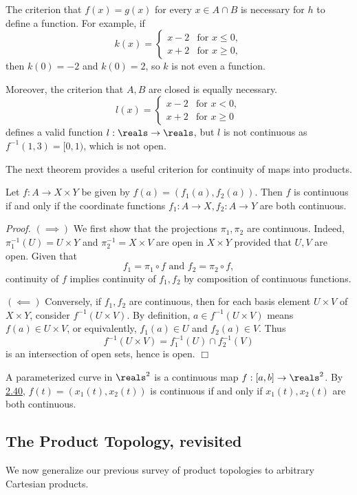 The criterion that $f(x) = g(x)$ for every $x \in A \cap B$ is necessary for $h$ to define a function. For example, if
$$k(x) = \begin{cases}
    x-2 &\text{for } x \leq 0, \\
    x+2 &\text{for } x \geq 0,
\end{cases}$$
then $k(0) = -2$ and $k(0) = 2$, so $k$ is not even a function.

Moreover, the criterion that $A, B$ are closed is equally necessary. 
$$l(x) = \begin{cases}
    x-2 &\text{for } x < 0, \\
    x+2 &\text{for } x \geq 0
\end{cases}$$
defines a valid function $l: \reals \rightarrow \reals$, but $l$ is not continuous as $f^{-1}(1, 3) = [0, 1)$, which is not open.

The next theorem provides a useful criterion for continuity of maps into products.
\begin{theorem}\label{2.40}
    Let $f: A \rightarrow X \times Y$ be given by $f(a) = (f_1(a), f_2(a))$. Then $f$ is continuous if and only if the coordinate functions $f_1: A \rightarrow X, f_2: A \rightarrow Y$ are both continuous.
\end{theorem}
{\it Proof.} $(\implies)$ We first show that the projections $\pi_1, \pi_2$ are continuous. Indeed, $\pi_1^{-1}(U) = U \times Y$ and $\pi_2^{-1} = X \times V$ are open in $X \times Y$ provided that $U, V$ are open. Given that
$$f_1 = \pi_1 \circ f \text{ and } f_2 = \pi_2 \circ f,$$
continuity of $f$ implies continuity of $f_1, f_2$ by composition of continuous functions. 

$(\impliedby)$ Conversely, if $f_1, f_2$ are continuous, then for each basis element $U \times V$ of $X \times Y$, consider $f^{-1}(U \times V)$. By definition, $a \in f^{-1}(U \times V)$ means $f(a) \in U \times V$, or equivalently, $f_1(a) \in U$ and $f_2(a) \in V$. Thus
$$f^{-1}(U \times V) = f_1^{-1}(U) \cap f_2^{-1}(V)$$
is an intersection of open sets, hence is open. $\Box$

A parameterized curve in $\reals^2$ is a continuous map $f: [a, b] \rightarrow \reals^2$. By \hyperref[2.40]{2.40}, $f(t) = (x_1(t), x_2(t))$ is continuous if and only if $x_1(t), x_2(t)$ are both continuous.

\subsection{The Product Topology, revisited}
We now generalize our previous survey of product topologies to arbitrary Cartesian products.


